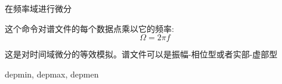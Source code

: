 \label{cmd:mulomega}

在频率域进行微分

这个命令对谱文件的每个数据点乘以它的频率:
\[ \Omega = 2 \pi f\]

这是对时间域微分的等效模拟。谱文件可以是振幅-相位型或者实部-虚部型

depmin, depmax, depmen
